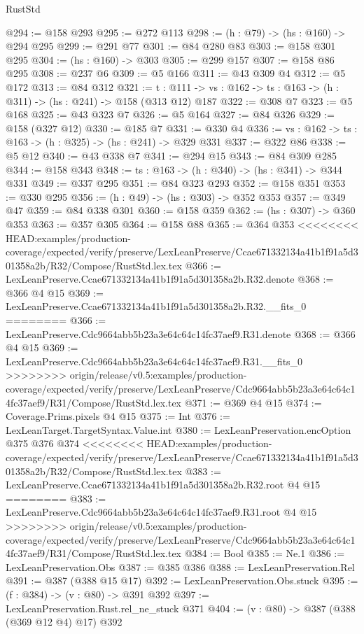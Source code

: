 \begin{lexlean}{RustStd}
\begin{coremodule}
{\begin{coremodule}
@294 := @158 @293
@295 := @272 @113
@298 := (h : @79) -> (hs : @160) -> @294 @295
@299 := @291 @77
@301 := @84 @280 @83
@303 := @158 @301 @295
@304 := (hs : @160) -> @303
@305 := @299 @157
@307 := @158 @86 @295
@308 := @237 @6
@309 := @5 @166
@311 := @43 @309 @4
@312 := @5 @172
@313 := @84 @312
@321 := {t : @111} ->
  {vs : @162} -> {ts : @163} -> (h : @311) -> (hs : @241) -> @158 (@313 @12) @187
@322 := @308 @7
@323 := @5 @168
@325 := @43 @323 @7
@326 := @5 @164
@327 := @84 @326
@329 := @158 (@327 @12)
@330 := @185 @7
@331 := @330 @4
@336 := {vs : @162} -> {ts : @163} -> (h : @325) -> (hs : @241) -> @329 @331
@337 := @322 @86
@338 := @5 @12
@340 := @43 @338 @7
@341 := @294 @15
@343 := @84 @309 @285
@344 := @158 @343
@348 := {ts : @163} -> (h : @340) -> (hs : @341) -> @344 @331
@349 := @337 @295
@351 := @84 @323 @293
@352 := @158 @351
@353 := @330 @295
@356 := (h : @49) -> (hs : @303) -> @352 @353
@357 := @349 @47
@359 := @84 @338 @301
@360 := @158 @359
@362 := (hs : @307) -> @360 @353
@363 := @357 @305
@364 := @158 @88
@365 := @364 @353
<<<<<<<< HEAD:examples/production-coverage/expected/verify/preserve/LexLeanPreserve/Ccae671332134a41b1f91a5d301358a2b/R32/Compose/RustStd.lex.tex
@366 := LexLeanPreserve.Ccae671332134a41b1f91a5d301358a2b.R32.denote
@368 := @366 @4 @15
@369 := LexLeanPreserve.Ccae671332134a41b1f91a5d301358a2b.R32.__fits_0
========
@366 := LexLeanPreserve.Cdc9664abb5b23a3e64c64c14fc37aef9.R31.denote
@368 := @366 @4 @15
@369 := LexLeanPreserve.Cdc9664abb5b23a3e64c64c14fc37aef9.R31.__fits_0
>>>>>>>> origin/release/v0.5:examples/production-coverage/expected/verify/preserve/LexLeanPreserve/Cdc9664abb5b23a3e64c64c14fc37aef9/R31/Compose/RustStd.lex.tex
@371 := @369 @4 @15
@374 := Coverage.Prims.pixels @4 @15
@375 := Int
@376 := LexLeanTarget.TargetSyntax.Value.int
@380 := LexLeanPreservation.encOption @375 @376 @374
<<<<<<<< HEAD:examples/production-coverage/expected/verify/preserve/LexLeanPreserve/Ccae671332134a41b1f91a5d301358a2b/R32/Compose/RustStd.lex.tex
@383 := LexLeanPreserve.Ccae671332134a41b1f91a5d301358a2b.R32.root @4 @15
========
@383 := LexLeanPreserve.Cdc9664abb5b23a3e64c64c14fc37aef9.R31.root @4 @15
>>>>>>>> origin/release/v0.5:examples/production-coverage/expected/verify/preserve/LexLeanPreserve/Cdc9664abb5b23a3e64c64c14fc37aef9/R31/Compose/RustStd.lex.tex
@384 := Bool
@385 := Ne.{1}
@386 := LexLeanPreservation.Obs
@387 := @385 @386
@388 := LexLeanPreservation.Rel
@391 := @387 (@388 @15 @17)
@392 := LexLeanPreservation.Obs.stuck
@395 := (f : @384) -> (v : @80) -> @391 @392
@397 := LexLeanPreservation.Rust.rel_ne_stuck @371
@404 := (v : @80) -> @387 (@388 (@369 @12 @4) @17) @392

\end{coremodule}}
\end{coremodule}
\end{lexlean}
